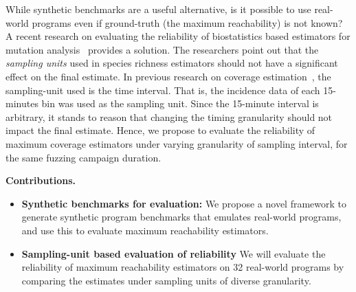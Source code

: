 \documentclass[conference]{IEEEtran}
\begin{document}
While synthetic benchmarks are a useful alternative, is it possible to use
real-world programs even if ground-truth (the maximum reachability) is not
known? A recent research on evaluating the reliability of biostatistics based
estimators for mutation analysis~\cite{kuznetsov2024empirical} provides a
solution. The researchers point out that the \emph{sampling units} used in
species richness estimators should not have a significant effect on the final
estimate. In previous research on coverage estimation~\cite{reachability_2023},
the sampling-unit used is the time interval. That is, the incidence data of
each 15-minutes bin was used as the sampling unit. Since the 15-minute interval
is arbitrary, it stands to reason that changing the timing granularity should
not impact the final estimate. Hence, we propose to evaluate the reliability of
maximum coverage estimators under varying granularity of sampling interval,
for the same fuzzing campaign duration.



\noindent{}\textbf{Contributions.}

\begin{itemize}
  \item \textbf{Synthetic benchmarks for evaluation:} We propose a novel
framework to generate synthetic program benchmarks that emulates real-world
programs, and use this to evaluate maximum reachability estimators.

  \item \textbf{Sampling-unit based evaluation of reliability} We will evaluate
    the reliability of maximum reachability estimators on 32 real-world programs
    by comparing the estimates under sampling units of diverse granularity.

    

\end{itemize}
\end{document}
